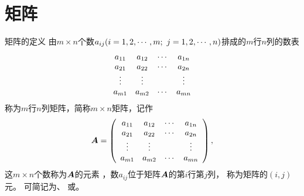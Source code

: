 
\section{矩阵}

\begin{frame}
    \begin{block}{矩阵的定义}
      由$m\times n$个数$a_{ij}(i=1,2,\cdots,m; \ j = 1, 2, \cdots, n)$排成的$m$行$n$列的数表
      $$
      \begin{array}{cccc}
        a_{11} & a_{12} & \cdots & a_{1n}\\
        a_{21} & a_{22} & \cdots & a_{2n}\\
        \vdots    & \vdots   &     & \vdots \\
        a_{m1} & a_{m2} & \cdots & a_{mn}\\
      \end{array}
      $$
      称为$m$行$n$列矩阵，简称$m \times n$矩阵，记作
      $$
      {\boldsymbol{A}} = \left(
      \begin{array}{cccc}
        a_{11} & a_{12} & \cdots & a_{1n}\\
        a_{21} & a_{22} & \cdots & a_{2n}\\
        \vdots    & \vdots   &     & \vdots \\
        a_{m1} & a_{m2} & \cdots & a_{mn}\\
      \end{array}
      \right),
      $$
      这$m \times n$个数称为$\boldsymbol{A}$的元素
      ，数$a_{ij}$位于矩阵$\boldsymbol{A}$的第$i$行第$j$列，
      称为矩阵的$(i,j)$元。 \pause       
      可简记为、
      或。
    \end{block}
\end{frame}

